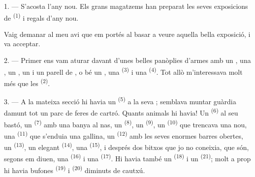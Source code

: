 %
%

\VUsaut{4.0mm}
\VUsaut{2.0mm}
\VUsaut{3.4mm}

1. --- S'acosta l'any nou. Els grans magatzems han preparat les seves exposicions
de  \textsuperscript{(1)} i regals d'any nou.

Vaig demanar al meu avi que em portés al basar a veure aquella bella exposició, i
va acceptar.

2. --- Primer ens vam aturar davant d'unes belles panòplies d'armes amb un
, una , un , un 
i un parell de , o bé un , una 
\textsuperscript{(3)} i una  \textsuperscript{(4)}. Tot allò
m'interessava molt més que les 
\textsuperscript{(2)}.

\VUsaut{3.0mm}
\VUsaut{2.6mm}

3. --- A la mateixa secció hi havia un  \textsuperscript{(5)} a
la seva ; semblava muntar guàrdia damunt tot un parc de feres de
cartró. Quants animals hi havia! Un  \textsuperscript{(6)} al seu
bastó, un  \textsuperscript{(7)} amb una banya al nas, un
 \textsuperscript{(8)}, un  \textsuperscript{(9)}, un
 \textsuperscript{(10)} que trencava una nou, una 
\textsuperscript{(11)} que s'enduia una gallina, un 
\textsuperscript{(12)} amb les seves enormes barres obertes, un 
\textsuperscript{(13)}, un elegant  \textsuperscript{(14)}, una
 \textsuperscript{(15)}, i després dos bitxos que jo no coneixia,
que són, segons em diuen, una  \textsuperscript{(16)} i una
 \textsuperscript{(17)}. Hi havia també un 
\textsuperscript{(18)} i un  \textsuperscript{(21)}; molt a prop hi
havia bufones  \textsuperscript{(19)} i 
\textsuperscript{(20)} diminuts de cautxú.

